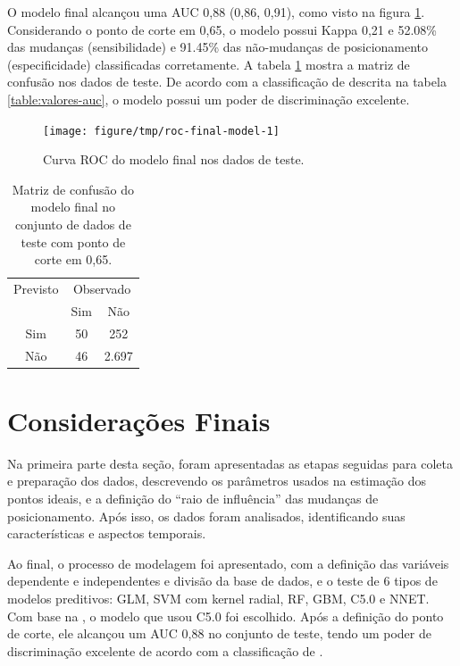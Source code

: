 \documentclass[a4paper,titlepage]{ppgi}\usepackage[]{graphicx}\usepackage[]{color}
\newenvironment{knitrout}{}{} %
\begin{document}
O modelo final alcançou uma \gls{AUC} 0,88
(0,86, 0,91),
como visto na figura \ref{fig:roc-final-model}. Considerando o ponto de corte
em 0,65, o modelo possui Kappa
0,21 e
52.08\% das mudanças
(sensibilidade) e 91.45\%
das não-mudanças de posicionamento (especificidade) classificadas corretamente.
A tabela \ref{table:confusion-matrix-final-model} mostra a matriz de confusão
nos dados de teste. De acordo com a classificação de 
descrita na tabela \ref{table:valores-auc}, o modelo possui um poder de
discriminação excelente.

\begin{knitrout}
\color{fgcolor}\begin{figure}
\texttt{[image: figure/tmp/roc-final-model-1]} \caption[Curva ROC do modelo final nos dados de teste]{Curva ROC do modelo final nos dados de teste.}\label{fig:roc-final-model}
\end{figure}


\end{knitrout}

\begin{table}
\centering
\begin{tabular}{c c c}
  Previsto & \multicolumn{2}{c}{Observado} \\  \cline{2-3}
  & \multicolumn{1}{|c}{Sim} & \multicolumn{1}{c|}{Não} \\
  \hline
  \multicolumn{1}{|c|}{Sim} & 50 & \multicolumn{1}{c|}{252} \\
  \multicolumn{1}{|c|}{Não} & 46 & \multicolumn{1}{c|}{2.697} \\
  \hline
\end{tabular}
\caption{Matriz de confusão do modelo final no conjunto de dados de teste com ponto de corte em 0,65.}
\label{table:confusion-matrix-final-model}
\end{table}

\section{Considerações Finais}

Na primeira parte desta seção, foram apresentadas as etapas seguidas para
coleta e preparação dos dados, descrevendo os parâmetros usados na estimação
dos pontos ideais, e a definição do ``raio de influência'' das mudanças de
posicionamento. Após isso, os dados foram analisados, identificando suas
características e aspectos temporais.

Ao final, o processo de modelagem foi apresentado, com a definição das
variáveis dependente e independentes e divisão da base de dados, e o teste de 6
tipos de modelos preditivos: \gls{GLM}, SVM com kernel radial, \gls{RF},
\gls{GBM}, C5.0 e \gls{NNET}. Com base na , o modelo que usou
C5.0 foi escolhido. Após a definição do ponto de corte, ele alcançou um
\gls{AUC} 0,88 no conjunto de teste, tendo um
poder de discriminação excelente de acordo com a classificação de
.
\end{document}
